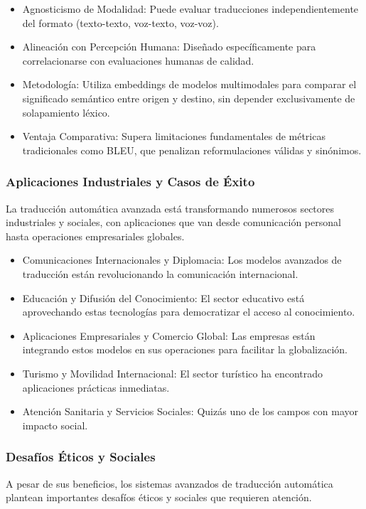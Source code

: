 \begin{itemize}
    \item Agnosticismo de Modalidad: Puede evaluar traducciones independientemente del formato (texto-texto, voz-texto, voz-voz).
    \item Alineación con Percepción Humana: Diseñado específicamente para correlacionarse con evaluaciones humanas de calidad.
    \item Metodología: Utiliza embeddings de modelos multimodales para comparar el significado semántico entre origen y destino, sin depender exclusivamente de solapamiento léxico.
    \item Ventaja Comparativa: Supera limitaciones fundamentales de métricas tradicionales como BLEU, que penalizan reformulaciones válidas y sinónimos.
\end{itemize}

\subsubsection{Aplicaciones Industriales y Casos de Éxito}
La traducción automática avanzada está transformando numerosos sectores industriales y sociales, con aplicaciones que van desde comunicación personal hasta operaciones empresariales globales.

\begin{itemize}
    \item Comunicaciones Internacionales y Diplomacia: Los modelos avanzados de traducción están revolucionando la comunicación internacional.
    \item Educación y Difusión del Conocimiento: El sector educativo está aprovechando estas tecnologías para democratizar el acceso al conocimiento.
    \item Aplicaciones Empresariales y Comercio Global: Las empresas están integrando estos modelos en sus operaciones para facilitar la globalización.
    \item Turismo y Movilidad Internacional: El sector turístico ha encontrado aplicaciones prácticas inmediatas.
    \item Atención Sanitaria y Servicios Sociales: Quizás uno de los campos con mayor impacto social.
\end{itemize}

\subsubsection{Desafíos Éticos y Sociales}
A pesar de sus beneficios, los sistemas avanzados de traducción automática plantean importantes desafíos éticos y sociales que requieren atención.

